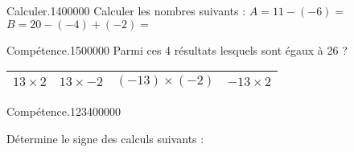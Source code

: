 \begin{pageAD}  %
\restoregeometry %


\begin{ExoCad}{Calculer.}{14}{0}{0}{0}{0}{0}
Calculer les nombres suivants :
$A = 11 - (-6) = $ 
$B = 20 - (-4) + (-2) = $ 
\end{ExoCad}

 

\begin{ExoCad}{Compétence.}{15}{0}{0}{0}{0}{0}
Parmi ces 4 résultats lesquels sont égaux à 26 ?

\begin{tabular}{|c|c|c|c|}
\hline 
$13 \times 2 $  & $13 \times -2 $ & $(-13) \times (-2) $ & $-13 \times 2 $ \\ 
\hline 
\end{tabular} 

\end{ExoCad}

 

\begin{ExoCad}{Compétence.}{1234}{0}{0}{0}{0}{0}

Détermine le signe des calculs suivants :

\end{ExoCad}
 
\end{pageAD} %


